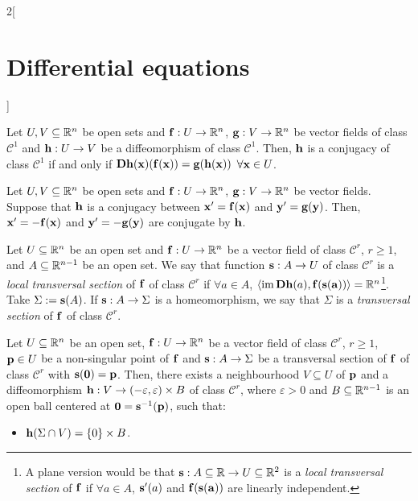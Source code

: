\documentclass[../../../main.tex]{subfiles}
\begin{document}
\begin{multicols}{2}[\section{Differential equations}]
\begin{definition}
  \end{definition}
  \begin{lemma}
    Let $U,V\subseteq \mathbb{R}^n$ be open sets and $\boldsymbol{\mathrm{f}}:U\rightarrow\mathbb{R}^n$, $\boldsymbol{\mathrm{g}}:V\rightarrow\mathbb{R}^n$ be vector fields of class $\mathcal{C}^1$ and $\boldsymbol{\mathrm{h}}:U\rightarrow V$ be a diffeomorphism of class $\mathcal{C}^1$. Then, $\boldsymbol{\mathrm{h}}$ is a conjugacy of class $\mathcal{C}^1$ if and only if $\boldsymbol{\mathrm{Dh}}(\boldsymbol{\mathrm{x}})(\boldsymbol{\mathrm{f}}(\boldsymbol{\mathrm{x}}))=\boldsymbol{\mathrm{g}}(\boldsymbol{\mathrm{h}}(\boldsymbol{\mathrm{x}}))$ $\forall \boldsymbol{\mathrm{x}}\in U$.
  \end{lemma}
  \begin{proposition}
    Let $U,V\subseteq \mathbb{R}^n$ be open sets and $\boldsymbol{\mathrm{f}}:U\rightarrow\mathbb{R}^n$, $\boldsymbol{\mathrm{g}}:V\rightarrow\mathbb{R}^n$ be vector fields. Suppose that $\boldsymbol{\mathrm{h}}$ is a conjugacy between $\boldsymbol{\mathrm{x}}'=\boldsymbol{\mathrm{f}}(\boldsymbol{\mathrm{x}})$ and $\boldsymbol{\mathrm{y}}'=\boldsymbol{\mathrm{g}}(\boldsymbol{\mathrm{y}})$. Then, $\boldsymbol{\mathrm{x}}'=-\boldsymbol{\mathrm{f}}(\boldsymbol{\mathrm{x}})$ and $\boldsymbol{\mathrm{y}}'=-\boldsymbol{\mathrm{g}}(\boldsymbol{\mathrm{y}})$ are conjugate by $\boldsymbol{\mathrm{h}}$.
  \end{proposition}
  \begin{definition}
    Let $U\subseteq\mathbb{R}^n$ be an open set and $\boldsymbol{\mathrm{f}}:U\rightarrow\mathbb{R}^n$ be a vector field of class $\mathcal{C}^r$, $r\geq 1$, and $A\subseteq \mathbb{R}^{n-1}$ be an open set. We say that function $\boldsymbol{\mathrm{s}}:A\rightarrow U$ of class $\mathcal{C}^r$ is a \emph{local transversal section} of $\boldsymbol{\mathrm{f}}$ of class $\mathcal{C}^r$ if $\forall a\in A$, $\langle\operatorname{im} \boldsymbol{\mathrm{Dh}}(a),\boldsymbol{\mathrm{f}}(\boldsymbol{\mathrm{s}}(\boldsymbol{\mathrm{a}}))\rangle=\mathbb{R}^n$\footnote{A plane version would be that $\boldsymbol{\mathrm{s}}:A\subseteq \mathbb{R}\rightarrow U\subseteq \mathbb{R}^2$ is a \emph{local transversal section} of $\boldsymbol{\mathrm{f}}$ if $\forall a\in A$, $\boldsymbol{\mathrm{s}}'(a)$ and $\boldsymbol{\mathrm{f}}(\boldsymbol{\mathrm{s}}(\boldsymbol{\mathrm{a}}))$ are linearly independent.}. Take $\Sigma:=\boldsymbol{\mathrm{s}}(A)$. If $\boldsymbol{\mathrm{s}}:A\rightarrow\Sigma$ is a homeomorphism, we say that $\Sigma$ is a \emph{transversal section} of $\boldsymbol{\mathrm{f}}$ of class $\mathcal{C}^r$.
  \end{definition}
  \begin{theorem}
    Let $U\subseteq \mathbb{R}^n$ be an open set, $\boldsymbol{\mathrm{f}}:U\rightarrow\mathbb{R}^n$ be a vector field of class $\mathcal{C}^r$, $r\geq 1$, $\boldsymbol{\mathrm{p}}\in U$ be a non-singular point of $\boldsymbol{\mathrm{f}}$ and $\boldsymbol{\mathrm{s}}:A\rightarrow\Sigma$ be a transversal section of $\boldsymbol{\mathrm{f}}$ of class $\mathcal{C}^r$ with $\boldsymbol{\mathrm{s}}(\boldsymbol{\mathrm{0}})=\boldsymbol{\mathrm{p}}$. Then, there exists a neighbourhood $V\subseteq U$ of $\boldsymbol{\mathrm{p}}$ and a diffeomorphism $\boldsymbol{\mathrm{h}}:V\rightarrow(-\varepsilon,\varepsilon)\times B$ of class $\mathcal{C}^r$, where $\varepsilon>0$ and $B\subseteq\mathbb{R}^{n-1}$ is an open ball centered at $\boldsymbol{\mathrm{0}}=\boldsymbol{\mathrm{s}}^{-1}(\boldsymbol{\mathrm{p}})$, such that:
    \begin{itemize}
      \item $\boldsymbol{\mathrm{h}}(\Sigma\cap V)=\{0\}\times B$.

\end{itemize}
\end{theorem}
\end{multicols}
\end{document}
